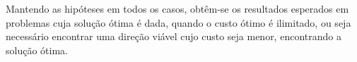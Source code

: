 \documentclass[
	12pt,				%
	openright,			%
	oneside,			%
	a4paper,			%
	english,			%
	french,				%
	spanish,			%
	brazil,				%
	]{abntex2}
\begin{document}
Mantendo as hipóteses em todos os casos, obtêm-se os resultados esperados em problemas cuja 
solução ótima é dada, quando o custo ótimo é ilimitado, ou seja necessário encontrar uma 
direção viável cujo custo seja menor, encontrando a solução ótima.
%
%
%
%
%
%
%

\postextual



%
%

\end{document}
